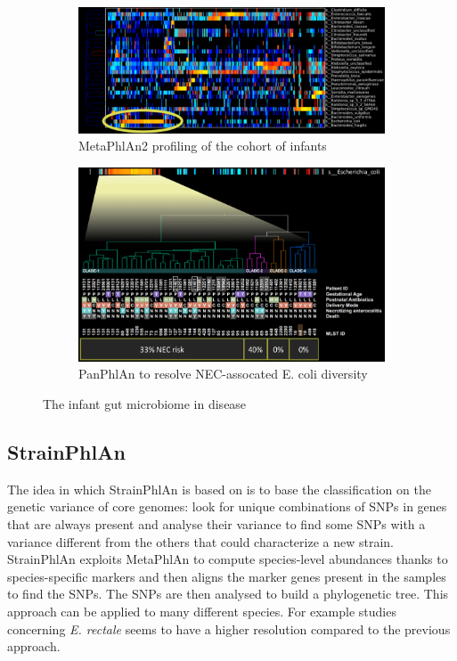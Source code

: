             \begin{figure}[!h]
            \centering
            \begin{subfigure}{.45\textwidth}
                \centering
                \includegraphics[width=\linewidth]{nec1.png}
                \caption{\label{fig:nec1}MetaPhlAn2 profiling of the cohort of infants}
            \end{subfigure}
            \begin{subfigure}{.45\textwidth}
                \centering
                \includegraphics[width=\linewidth]{nec2.png}
                \caption{\label{fig:nec2}PanPhlAn to resolve NEC-assocated E. coli diversity}
            \end{subfigure}
            \caption{The infant gut microbiome in disease}
            \end{figure}

    \subsection{StrainPhlAn}
    The idea in which StrainPhlAn is based on is to base the classification on the genetic variance of core genomes: look for unique combinations of SNPs in genes that are always present and analyse their variance to find some SNPs with a variance different from the others that could characterize a new strain.
    StrainPhlAn exploits MetaPhlAn to compute species-level abundances thanks to species-specific markers and then aligns the marker genes present in the samples to find the SNPs.
    The SNPs are then analysed to build a phylogenetic tree.
    This approach can be applied to many different species.
    For example studies concerning \emph{E. rectale} seems to have a higher resolution compared to the previous approach.


